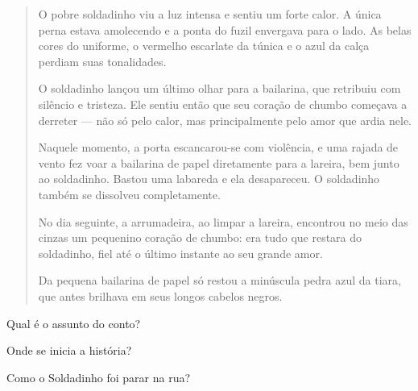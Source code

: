 \begin{conteudo}
\begin{conteudo}
\begin{conteudo}
\begin{conteudo}
\begin{quote}
O pobre soldadinho viu a luz intensa e sentiu um forte calor. A única
perna estava amolecendo e a ponta do fuzil envergava para o lado. As
belas cores do uniforme, o vermelho escarlate da túnica e o azul da
calça perdiam suas tonalidades.

O soldadinho lançou um último olhar para a bailarina, que retribuiu com
silêncio e tristeza. Ele sentiu então que seu coração de chumbo começava
a derreter --- não só pelo calor, mas principalmente pelo amor que ardia
nele.

Naquele momento, a porta escancarou-se com violência, e uma rajada de
vento fez voar a bailarina de papel diretamente para a lareira, bem
junto ao soldadinho. Bastou uma labareda e ela desapareceu. O soldadinho
também se dissolveu completamente.

No dia seguinte, a arrumadeira, ao limpar a lareira, encontrou no meio
das cinzas um pequenino coração de chumbo: era tudo que restara do
soldadinho, fiel até o último instante ao seu grande amor.

Da pequena bailarina de papel só restou a minúscula pedra azul da tiara,
que antes brilhava em seus longos cabelos negros.

\end{quote}


\begin{escolha}
\item Qual é o assunto do conto?
\item{}

\item Onde se inicia a história?
\item{}

\item Como o Soldadinho foi parar na rua?
\item{}


\end{escolha}
\end{conteudo}
\end{conteudo}
\end{conteudo}
\end{conteudo}
